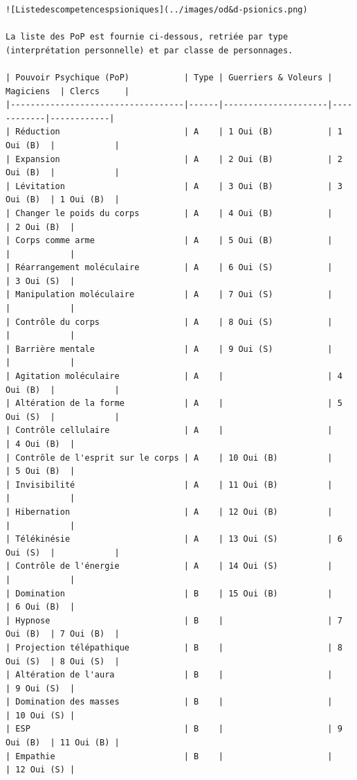 \documentclass[11pt]{article}
\begin{document}
{\begin{verbatim}
![Listedescompetencespsioniques](../images/od&d-psionics.png)

La liste des PoP est fournie ci-dessous, retriée par type (interprétation personnelle) et par classe de personnages.

| Pouvoir Psychique (PoP)           | Type | Guerriers & Voleurs | Magiciens  | Clercs     |
|-----------------------------------|------|---------------------|------------|------------|
| Réduction                         | A    | 1 Oui (B)           | 1 Oui (B)  |            |
| Expansion                         | A    | 2 Oui (B)           | 2 Oui (B)  |            |
| Lévitation                        | A    | 3 Oui (B)           | 3 Oui (B)  | 1 Oui (B)  |
| Changer le poids du corps         | A    | 4 Oui (B)           |            | 2 Oui (B)  |
| Corps comme arme                  | A    | 5 Oui (B)           |            |            |
| Réarrangement moléculaire         | A    | 6 Oui (S)           |            | 3 Oui (S)  |
| Manipulation moléculaire          | A    | 7 Oui (S)           |            |            |
| Contrôle du corps                 | A    | 8 Oui (S)           |            |            |
| Barrière mentale                  | A    | 9 Oui (S)           |            |            |
| Agitation moléculaire             | A    |                     | 4 Oui (B)  |            |
| Altération de la forme            | A    |                     | 5 Oui (S)  |            |
| Contrôle cellulaire               | A    |                     |            | 4 Oui (B)  |
| Contrôle de l'esprit sur le corps | A    | 10 Oui (B)          |            | 5 Oui (B)  |
| Invisibilité                      | A    | 11 Oui (B)          |            |            |
| Hibernation                       | A    | 12 Oui (B)          |            |            |
| Télékinésie                       | A    | 13 Oui (S)          | 6 Oui (S)  |            |
| Contrôle de l'énergie             | A    | 14 Oui (S)          |            |            |
| Domination                        | B    | 15 Oui (B)          |            | 6 Oui (B)  |
| Hypnose                           | B    |                     | 7 Oui (B)  | 7 Oui (B)  |
| Projection télépathique           | B    |                     | 8 Oui (S)  | 8 Oui (S)  |
| Altération de l'aura              | B    |                     |            | 9 Oui (S)  |
| Domination des masses             | B    |                     |            | 10 Oui (S) |
| ESP                               | B    |                     | 9 Oui (B)  | 11 Oui (B) |
| Empathie                          | B    |                     |            | 12 Oui (S) |

\end{verbatim}}
\end{document}
